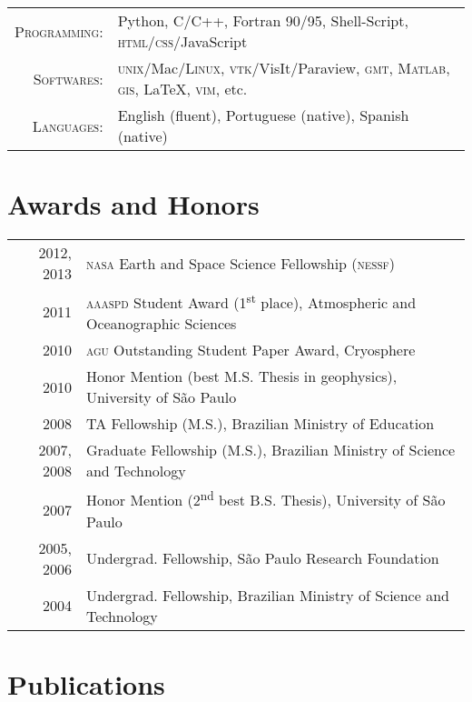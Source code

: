 \documentclass[a4paper,11pt]{article}
\begin{document}
\begin{tabular}{rl}
\textsc{Programming:} & Python, C/C++, Fortran 90/95, Shell-Script, \textsc{html}/\textsc{css}/JavaScript\\
\textsc{Softwares:} & \textsc{unix}/Mac/\textsc{Linux}, \textsc{vtk}/VisIt/Paraview, \textsc{gmt}, \textsc{Matlab}, \textsc{gis}, \LaTeX, \textsc{vim}, etc.\\
\textsc{Languages:} & English (fluent), Portuguese (native), Spanish (native)
\end{tabular}


\section{Awards and Honors}

\begin{tabular}{rl}
2012, 2013 & \textsc{nasa} Earth and Space Science Fellowship (\textsc{nessf})\\ 
2011 & \textsc{aaaspd} Student Award (1\textsuperscript{st} place), Atmospheric and Oceanographic Sciences\\
2010 & \textsc{agu} Outstanding Student Paper Award, Cryosphere\\
2010 & Honor Mention (best M.S. Thesis in geophysics), University of S\~ao Paulo\\
2008 & TA Fellowship (M.S.), Brazilian Ministry of Education\\
2007, 2008 & Graduate Fellowship (M.S.), Brazilian Ministry of Science and Technology\\
2007 & Honor Mention (2\textsuperscript{nd} best B.S. Thesis), University of S\~ao Paulo\\
2005, 2006 & Undergrad. Fellowship, S\~ao Paulo Research Foundation\\
2004 & Undergrad. Fellowship, Brazilian Ministry of Science and Technology
\end{tabular}


\section{Publications}
\end{document}
